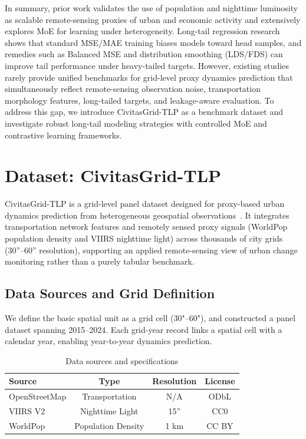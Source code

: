 \documentclass[preprint,12pt]{elsarticle}
\begin{document}
In summary, prior work validates the use of population and nighttime luminosity as scalable remote-sensing proxies of urban and economic activity and extensively explores MoE for learning under heterogeneity. Long-tail regression research shows that standard MSE/MAE training biases models toward head samples, and remedies such as Balanced MSE and distribution smoothing (LDS/FDS) can improve tail performance under heavy-tailed targets. However, existing studies rarely provide unified benchmarks for grid-level proxy dynamics prediction that simultaneously reflect remote-sensing observation noise, transportation morphology features, long-tailed targets, and leakage-aware evaluation. To address this gap, we introduce CivitasGrid-TLP as a benchmark dataset and investigate robust long-tail modeling strategies with controlled MoE and contrastive learning frameworks.



\section{Dataset: CivitasGrid-TLP}

CivitasGrid-TLP is a grid-level panel dataset designed for proxy-based urban dynamics prediction from heterogeneous geospatial observations~\cite{huang_2026_18144416}. It integrates transportation network features and remotely sensed proxy signals (WorldPop population density and VIIRS nighttime light) across thousands of city grids (30''--60'' resolution), supporting an applied remote-sensing view of urban change monitoring rather than a purely tabular benchmark.

\subsection{Data Sources and Grid Definition}

We define the basic spatial unit as a grid cell (30"–60"), and constructed a panel dataset spanning 2015–2024. Each grid-year record links a spatial cell with a calendar year, enabling year-to-year dynamics prediction.


\begin{table}[htbp]
    \centering

    \begin{tabular}{lccc}
        \toprule
        \textbf{Source} & \textbf{Type} & \textbf{Resolution} & \textbf{License}\\
        \midrule
         OpenStreetMap & Transportation & N/A & ODbL \\
         VIIRS V2 & Nighttime Light & 15'' & CC0 \\
         WorldPop & Population Density & 1 km & CC BY \\
        \bottomrule
    \end{tabular}
    \caption{Data sources and specifications}
    \label{tab:datasources}
    
\end{table}
\end{document}
